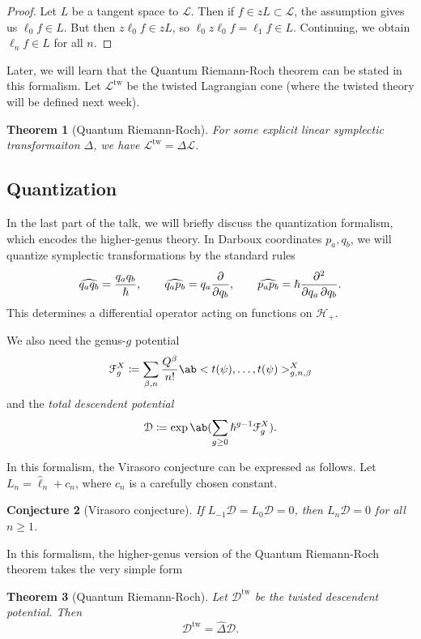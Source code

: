\documentclass[leqno, openany]{memoir}
\newtheorem{thm}{Theorem}[section]
\newtheorem{conj}[thm]{Conjecture}
\theoremstyle{definition}
\theoremstyle{remark}
\theoremstyle{plain}
\theoremstyle{definition}
\theoremstyle{remark}
\newcommand{\mc}[1]{\mathcal{#1}}
\newcommand{\mr}[1]{\mathrm{#1}}
\newcommand{\wh}[1]{\widehat{#1}}
\begin{document}
\begin{proof}
    Let $L$ be a tangent space to $\mc{L}$. Then if $f \in zL \subset \mc{L}$, the assumption gives us $\ell_0 f \in L$. But then $z \ell_0 f \in zL$, so $\ell_0 z \ell_0 f = \ell_1 f \in L$. Continuing, we obtain $\ell_n f \in L$ for all $n$.
\end{proof}

Later, we will learn that the Quantum Riemann-Roch theorem can be stated in this formalism. Let $\mc{L}^{\mr{tw}}$ be the twisted Lagrangian cone (where the twisted theory will be defined next week).
\begin{thm}[Quantum Riemann-Roch]
    For some explicit linear symplectic transformaiton $\Delta$, we have $\mc{L}^{\mr{tw}} = \Delta \mc{L}$.
\end{thm}




\subsection{Quantization}

In the last part of the talk, we will briefly discuss the quantization formalism, which encodes the higher-genus theory. In Darboux coordinates $p_a, q_b$, we will quantize symplectic transformations by the standard rules
\[ \wh{{q_a q_b}} = \frac{q_a q_b}{\hslash}, \qquad \wh{q_a p_b} = q_a \pdv{}{q_b}, \qquad \wh{p_a p_b} = \hslash \pdv{}{q_a,q_b}. \]
This determines a differential operator acting on functions on $\mc{H}_+$.

We also need the genus-$g$ potential
\[ \mc{F}_g^X \coloneqq \sum_{\beta, n} \frac{Q^{\beta}}{n!} \ab<t(\psi), \ldots, t(\psi)>_{g,n,\beta}^X \]
and the \textit{total descendent potential}
\[ \mc{D} \coloneqq \exp\ab(\sum_{g \geq 0} \hslash^{g-1} \mc{F}_g^X). \]

In this formalism, the Virasoro conjecture can be expressed as follows. Let $L_n = \wh{\ell}_n + c_n$, where $c_n$ is a carefully chosen constant.

\begin{conj}[Virasoro conjecture]
    If $L_{-1} \mc{D} = L_0 \mc{D} = 0$, then $L_n \mc{D} = 0$ for all $n \geq 1$.
\end{conj}

In this formalism, the higher-genus version of the Quantum Riemann-Roch theorem takes the very simple form
\begin{thm}[Quantum Riemann-Roch]
    Let $\mc{D}^{\mr{tw}}$ be the twisted descendent potential. Then
    \[ \mc{D}^{\mr{tw}} = \wh{\Delta} \mc{D}. \]
\end{thm}
\end{document}
